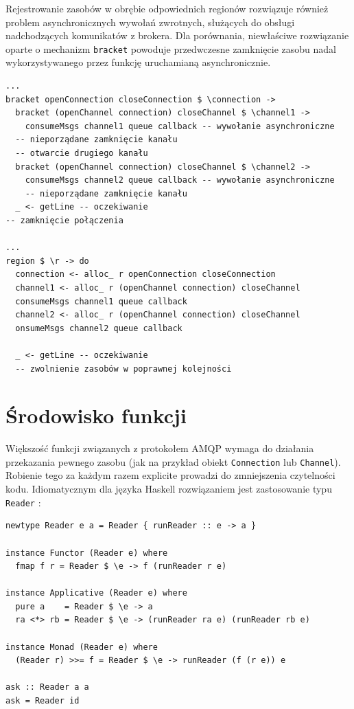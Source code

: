 Rejestrowanie zasobów w obrębie odpowiednich regionów rozwiązuje również problem asynchronicznych wywołań zwrotnych, służących do obsługi nadchodzących komunikatów z brokera. Dla porównania, niewłaściwe rozwiązanie oparte o mechanizm \lstinline{bracket} powoduje przedwczesne zamknięcie zasobu nadal wykorzystywanego przez funkcję uruchamianą asynchronicznie.
\begin{lstlisting}[caption=Problem funkcji asynchronicznych]
...
bracket openConnection closeConnection $ \connection ->
  bracket (openChannel connection) closeChannel $ \channel1 ->
    consumeMsgs channel1 queue callback -- wywołanie asynchroniczne
  -- nieporządane zamknięcie kanału
  -- otwarcie drugiego kanału
  bracket (openChannel connection) closeChannel $ \channel2 ->
    consumeMsgs channel2 queue callback -- wywołanie asynchroniczne
    -- nieporządane zamknięcie kanału
  _ <- getLine -- oczekiwanie
-- zamknięcie połączenia

...
region $ \r -> do
  connection <- alloc_ r openConnection closeConnection
  channel1 <- alloc_ r (openChannel connection) closeChannel
  consumeMsgs channel1 queue callback
  channel2 <- alloc_ r (openChannel connection) closeChannel
  onsumeMsgs channel2 queue callback

  _ <- getLine -- oczekiwanie
  -- zwolnienie zasobów w poprawnej kolejności
\end{lstlisting}
\newpage

\section{Środowisko funkcji}
Większość funkcji związanych z protokołem AMQP wymaga do działania przekazania pewnego zasobu (jak na przykład obiekt \lstinline{Connection} lub \lstinline{Channel}). Robienie tego za każdym razem explicite prowadzi do zmniejszenia czytelności kodu. Idiomatycznym dla języka Haskell rozwiązaniem jest zastosowanie typu \lstinline{Reader} \cite{Reader}: 
\begin{lstlisting}[caption=Typ reader]
newtype Reader e a = Reader { runReader :: e -> a }

instance Functor (Reader e) where
  fmap f r = Reader $ \e -> f (runReader r e)

instance Applicative (Reader e) where
  pure a    = Reader $ \e -> a
  ra <*> rb = Reader $ \e -> (runReader ra e) (runReader rb e)

instance Monad (Reader e) where 
  (Reader r) >>= f = Reader $ \e -> runReader (f (r e)) e

ask :: Reader a a
ask = Reader id
\end{lstlisting}

